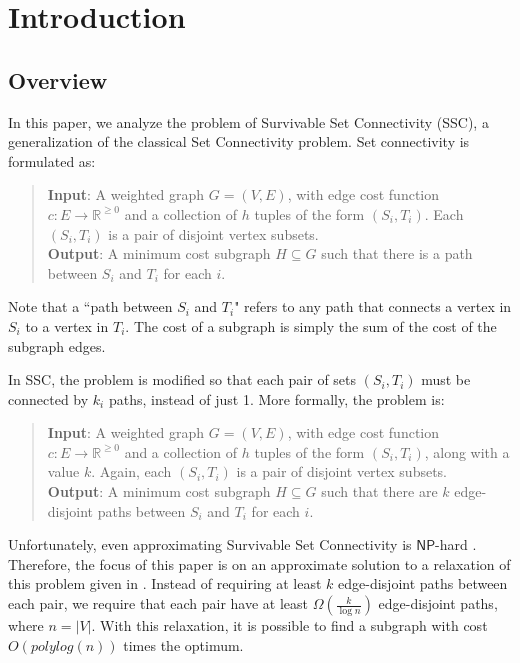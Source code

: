 \documentclass[12pt]{article}
\begin{document}
\maketitle

\section{Introduction}

\subsection{Overview}

In this paper, we analyze the problem of Survivable Set Connectivity (SSC), a generalization of the classical Set Connectivity problem. Set connectivity is formulated as:
\begin{quote}
\textbf{Input}: A weighted graph $G = (V, E)$, with edge cost function $c: E \rightarrow \mathbb{R}^{\geq 0}$ and a collection of $h$ tuples of the form $(S_i, T_i)$. Each $(S_i,T_i)$ is a pair of disjoint vertex subsets. \\
\textbf{Output}: A minimum cost subgraph $H \subseteq G$ such that there is a path between $S_i$ and $T_i$ for each $i$. 
\end{quote}

Note that a ``path between $S_i$ and $T_i$" refers to any path that connects a vertex in $S_i$ to a vertex in $T_i$. The cost of a subgraph is simply the sum of the cost of the subgraph edges.

In SSC, the problem is modified so that each pair of sets $(S_i,T_i)$ must be connected by $k_i$ paths, instead of just 1. More formally, the problem is:

\begin{quote}
\textbf{Input}: A weighted graph $G = (V, E)$, with edge cost function $c: E \rightarrow \mathbb{R}^{\geq 0}$ and a collection of $h$ tuples of the form $(S_i, T_i)$, along with a value $k$. Again, each $(S_i,T_i)$ is a pair of disjoint vertex subsets. \\
\textbf{Output}: A minimum cost subgraph $H \subseteq G$ such that there are $k$ edge-disjoint paths between $S_i$ and $T_i$ for each $i$. 
\end{quote}

Unfortunately, even approximating Survivable Set Connectivity is $\mathsf{NP}$-hard \cite{ssc}. Therefore, the focus of this paper is on an approximate solution to a relaxation of this problem given in \cite{ssc}. Instead of requiring at least $k$ edge-disjoint paths between each pair, we require that each pair have at least $\Omega(\frac{k}{\log n})$ edge-disjoint paths, where $n = |V|$. With this relaxation, it is possible to find a subgraph with cost $O(polylog(n))$ times the optimum.
\end{document}

